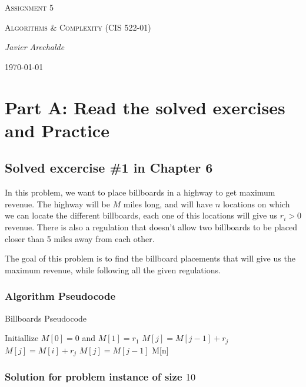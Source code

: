 \documentclass{article}
\begin{document}
\begin{titlepage}
	\centering
	{\scshape\LARGE Assignment 5\par}
	\vspace{1cm}
	{\scshape\Large Algorithms \& Complexity (CIS 522-01)\par}
	\vspace{1.5cm}
	{\Large\itshape Javier Arechalde\par}
	\vfill
	{\large \today\par}
\end{titlepage}

\section*{Part A: Read the solved exercises and Practice}

\subsection*{Solved excercise \#1 in Chapter 6}

In this problem, we want to place billboards in a highway to get maximum revenue. The highway will be $M$ miles long, and will have $n$ locations on which we can locate the different billboards, each one of this locations will give us $r_i>0$ revenue. There is also a regulation that doesn't allow two billboards to be placed closer than 5 miles away from each other.

The goal of this problem is to find the billboard placements that will give us the maximum revenue, while following all the given regulations.

\subsubsection*{Algorithm Pseudocode}

\begin{algorithm}[H]
\caption{Billboards Pseudocode}
\begin{algorithmic}[1]
\State Initiallize $M[0] = 0$ and $M[1] = r_1$
  \State $M[j] = M[j-1] + r_j$
   \State $M[j] = M[i] + r_j$
  \Else
   \State $M[j] = M[j-1]$
  \EndIf
 \EndIf
\EndFor
\State \Return M[n]
\end{algorithmic}
\end{algorithm}

\subsubsection*{Solution for problem instance of size $10$}
\end{document}
